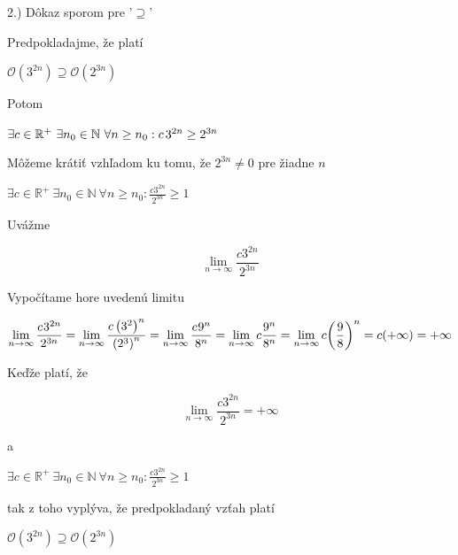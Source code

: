 \documentclass[11pt,a4paper]{article}
\begin{document}
\hspace{5mm}2.) Dôkaz sporom pre '$\supseteq$'

\begin{flushright}
\begin{minipage}{0.92\textwidth}
  Predpokladajme, že platí
  \begin{center}
    $\mathcal{O}(3^{2n}) \supseteq \mathcal{O}(2^{3n})$
  \end{center}
  Potom
  \begin{center}
    $\exists c \in \mathbb{R}^{+} \ \exists n_{0} \in \mathbb{N} \ \forall n \geq n_{0}: c\hspace{0.5mm}3^{2n} \geq 2^{3n}$
  \end{center}
  Môžeme krátiť vzhľadom ku tomu, že $2^{3n} \neq 0$ pre žiadne $n$
  \begin{center}
    $\exists c \in \mathbb{R}^{+} \ \exists n_{0} \in \mathbb{N} \ \forall n \geq n_{0}: \frac{c3^{2n}}{2^{3n}} \geq 1$
  \end{center}
  Uvážme\\[-3.5em]
  \begin{center}
    $$\lim_{n\to\infty} \frac{c3^{2n}}{2^{3n}}$$
  \end{center}
\end{minipage}
\end{flushright}

\begin{flushright}
\begin{minipage}{0.92\textwidth}
  Vypočítame hore uvedenú limitu\\[-3.5em]
  \begin{center}
    $$\lim_{n\to\infty} \frac{c\hspace{0.2mm}3^{2n}}{2^{3n}} = \lim_{n\to\infty} \frac{c\left(3^2\right)^n}{\left(2^3\right)^n} = \lim_{n\to\infty} \frac{c\hspace{0.2mm}9^n}{8^n} = \lim_{n\to\infty} c\frac{9^n}{8^n} = \lim_{n\to\infty} c{\left({\frac{9}{8}}\right)}^n = c(+\infty) = +\infty$$
  \end{center}
  Keďže platí, že\\[-3.5em]
  \begin{center}
    $$\lim_{n\to\infty} \frac{c3^{2n}}{2^{3n}} = +\infty$$
  \end{center}
  a
  \begin{center}
    $\exists c \in \mathbb{R}^{+} \ \exists n_{0} \in \mathbb{N} \ \forall n \geq n_{0}: \frac{c3^{2n}}{2^{3n}} \geq 1$
  \end{center}
  tak z toho vyplýva, že predpokladaný vzťah platí
  \begin{center}
    $\mathcal{O}(3^{2n}) \supseteq \mathcal{O}(2^{3n})$
  \end{center}
\end{minipage}
\end{flushright}
\end{document}

